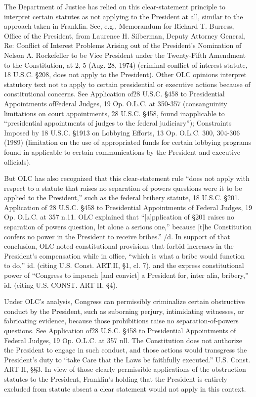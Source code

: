 The Department of Justice has relied on this clear-statement principle to interpret certain
statutes as not applying to the President at all, similar to the approach taken in Franklin. See, e.g.,
Memorandum for Richard T. Burress, Office of the President, from Laurence H. Silberman,
Deputy Attorney General, Re: Conflict of Interest Problems Arising out of the President's
Nomination of Nelson A. Rockefeller to be Vice President under the Twenty-Fifth Amendment to
the Constitution, at 2, 5 (Aug. 28, 1974) (criminal conflict-of-interest statute, 18 U.S.C. \S 208,
does not apply to the President). Other OLC opinions interpret statutory text not to apply to certain
presidential or executive actions because of constitutional concerns. See Application of28 U.S.C.
\S 458 to Presidential Appointments ofFederal Judges, 19 Op. O.L.C. at 350-357 (consanguinity
limitations on court appointments, 28 U.S.C. \S 458, found inapplicable to “presidential
appointments of judges to the federal judiciary”); Constraints Imposed by 18 U.S.C. \S 1913 on
Lobbying Efforts, 13 Op. O.L.C. 300, 304-306 (1989) (limitation on the use of appropriated funds
for certain lobbying programs found in applicable to certain communications by the President and
executive officials).

But OLC has also recognized that this clear-statement rule “does not apply with respect to
a statute that raises no separation of powers questions were it to be applied to the President,” such
as the federal bribery statute, 18 U.S.C. \S 201. Application of 28 U.S.C. \S 458 to Presidential
Appointments of Federal Judges, 19 Op. O.L.C. at 357 n.11. OLC explained that “[a]pplication
of \S 201 raises no separation of powers question, let alone a serious one,” because [t]he
Constitution confers no power in the President to receive bribes.” /d. In support of that conclusion,
OLC noted constitutional provisions that forbid increases in the President’s compensation while
in office, “which is what a bribe would function to do,” id. (citing U.S. Const. ART.II, \S 1, cl. 7),
and the express constitutional power of “Congress to impeach [and convict] a President for, inter
alia, bribery,” id. (citing U.S. CONST. ART II, \S 4).

Under OLC’s analysis, Congress can permissibly criminalize certain obstructive conduct
by the President, such as suborning perjury, intimidating witnesses, or fabricating evidence,
because those prohibitions raise no separation-of-powers questions. See Application of28 U.S.C.
\S 458 to Presidential Appointments of Federal Judges, 19 Op. O.L.C. at 357 nll. The
Constitution does not authorize the President to engage in such conduct, and those actions would
transgress the President’s duty to “take Care that the Laws be faithfully executed.” U.S. Const.
ART II, \S\S 3. In view of those clearly permissible applications of the obstruction statutes to the
President, Franklin’s holding that the President is entirely excluded from statute absent a clear
statement would not apply in this context.

